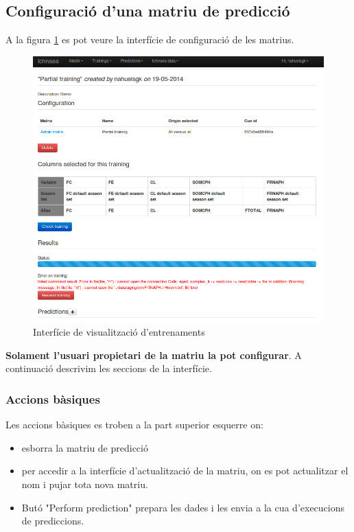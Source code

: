 \subsection{Configuració d'una matriu de predicció}
A la figura \ref{fig:view_training_pending} es pot veure la interfície de configuració de les matrius.
\begin{figure}[h!]
  \centering
  \includegraphics[scale=0.5]{img/userguide/view_training_pending.png}
  \caption{Interfície de visualització d'entrenaments}
  \label{fig:view_training_pending}
\end{figure}
\textbf{Solament l'usuari propietari de la matriu la pot configurar}. A continuació descrivim les seccions de la interfície.

\subsubsection{Accions bàsiques}
Les accions bàsiques es troben a la part superior esquerre on:
\begin{itemize}
\item \iconremove esborra la matriu de predicció
\item \iconupdate per accedir a la interfície d'actualització de la matriu, on es pot actualitzar el nom i pujar tota nova matriu.
\item But\'{o} "Perform prediction" prepara les dades i les envia a la cua d'execucions de prediccions.
\end{itemize}

